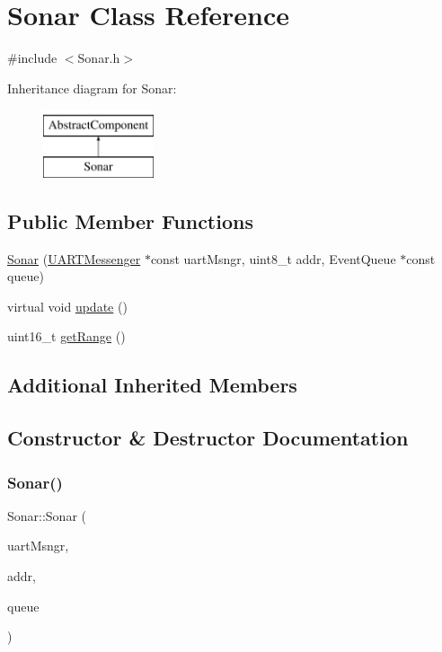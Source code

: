 \hypertarget{class_sonar}{}\section{Sonar Class Reference}
\label{class_sonar}


{\ttfamily \#include $<$Sonar.\+h$>$}

Inheritance diagram for Sonar\+:\begin{figure}[H]
\begin{center}
\leavevmode
\includegraphics[height=2.000000cm]{class_sonar}
\end{center}
\end{figure}
\subsection*{Public Member Functions}
\begin{DoxyCompactItemize}
\item 
\hyperlink{class_sonar_a8199e2b1d48626cc0404708063d7fe42}{Sonar} (\hyperlink{class_u_a_r_t_messenger}{U\+A\+R\+T\+Messenger} $\ast$const uart\+Msngr, uint8\+\_\+t addr, Event\+Queue $\ast$const queue)
\item 
virtual void \hyperlink{class_sonar_aaf10dd734528b86b4dea3ab35c4ee4f4}{update} ()
\item 
uint16\+\_\+t \hyperlink{class_sonar_a7a641bcfac1967fbc42eea2ab70886dc}{get\+Range} ()
\end{DoxyCompactItemize}
\subsection*{Additional Inherited Members}


\subsection{Constructor \& Destructor Documentation}
\mbox{\label{class_sonar_a8199e2b1d48626cc0404708063d7fe42}} 
\subsubsection{\texorpdfstring{Sonar()}{Sonar()}}
{\footnotesize\ttfamily Sonar\+::\+Sonar (\begin{DoxyParamCaption}\item[{\hyperlink{class_u_a_r_t_messenger}{U\+A\+R\+T\+Messenger} $\ast$const}]{uart\+Msngr,  }\item[{uint8\+\_\+t}]{addr,  }\item[{Event\+Queue $\ast$const}]{queue }\end{DoxyParamCaption})}


